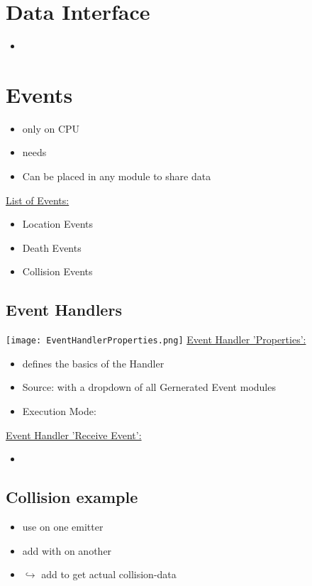         \section{Data Interface}
            \begin{itemize}
                \item 
            \end{itemize}

        \section{Events}
            \begin{itemize}
                \item only on CPU
                \item needs 
                \item Can be placed in any module to share data
            \end{itemize}
\bigskip
            \underline{List of Events:}
            \begin{itemize}
                \item Location Events
                \item Death Events
                \item Collision Events
            \end{itemize}

            \subsection{Event Handlers}
                \texttt{[image: EventHandlerProperties.png]}
                \underline{Event Handler 'Properties':}
                \begin{itemize}
                    \item defines the basics of the Handler
                    \item Source: with a dropdown of all Gernerated Event modules
                    \item Execution Mode: 
                \end{itemize}
\bigskip
                \underline{Event Handler 'Receive Event':}
                \begin{itemize}
                    \item 
                \end{itemize}

            \subsection{Collision example}
                \begin{itemize}
                    \item use  on one emitter
                    \item add  with  on another
                    \item $\hookrightarrow$ add  to get actual collision-data
                \end{itemize}

